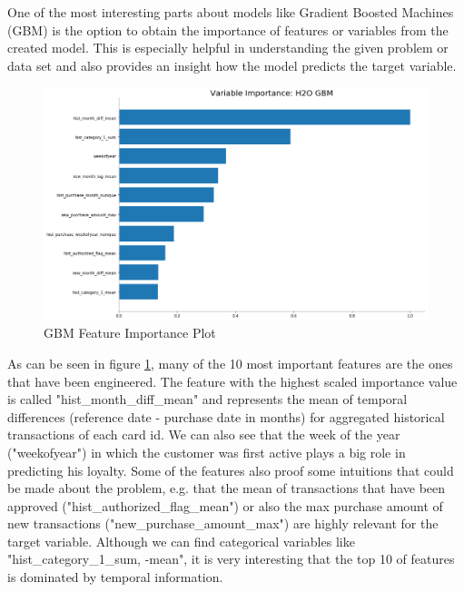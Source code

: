\documentclass{article}
\begin{document}

One of the most interesting parts about models like Gradient Boosted Machines (GBM) is the option to obtain the importance of features or variables from the created model. This is especially helpful in understanding the given problem or data set and also provides an insight how the model predicts the target variable.

\begin{figure}[h]
  \centering
  \includegraphics[width=350pt]{gbm_variable_importance}
  \caption{GBM Feature Importance Plot}
  \label{fig:gbm_variable_importance}
\end{figure}

As can be seen in figure \ref{fig:gbm_variable_importance}, many of the 10 most important features are the ones that have been engineered. The feature with the highest scaled importance value is called "hist\_month\_diff\_mean" and represents the mean of temporal differences (reference date - purchase date in months) for aggregated historical transactions of each card id. We can also see that the week of the year ("weekofyear") in which the customer was first active plays a big role in predicting his loyalty. Some of the features also proof some intuitions that could be made about the problem, e.g. that the mean of transactions that have been approved ("hist\_authorized\_flag\_mean") or also the max purchase amount of new transactions ("new\_purchase\_amount\_max") are highly relevant for the target variable. Although we can find categorical variables like "hist\_category\_1\_sum, -mean", it is very interesting that the top 10 of features is dominated by temporal information.
\end{document}
